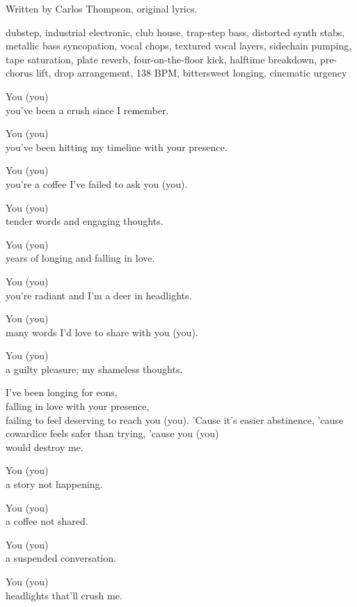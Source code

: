 
\label{sec:a-coffee-not-shared}
\begin{notes}
Written by Carlos Thompson, original lyrics.
\end{notes}
\begin{style}
dubstep, industrial electronic, club house, trap-step bass, distorted synth stabs, metallic bass syncopation, vocal chops, textured vocal layers, sidechain pumping, tape saturation, plate reverb, four-on-the-floor kick, halftime breakdown, pre-chorus lift, drop arrangement, 138 BPM, bittersweet longing, cinematic urgency
\end{style}
\begin{lyrics}
You (you)\\
you've been a crush since I remember.

You (you)\\
you've been hitting my timeline with your presence.

You (you)\\
you're a coffee I've failed to ask you (you).

You (you)\\
tender words and engaging thoughts.


You (you)\\
years of longing and falling in love.

You (you)\\
you're radiant and I'm a deer in headlights.

You (you)\\
many words I'd love to share with you (you).

You (you)\\
a guilty pleasure; my shameless thoughts.

I've been longing for eons,\\
falling in love with your presence,\\
failing to feel deserving to reach you (you).
'Cause it's easier abstinence,
'cause cowardice feels safer than trying,
'cause you (you)\\
would destroy me.

You (you)\\
a story not happening.

You (you)\\
a coffee not shared.

You (you)\\
a suspended conversation.

You (you)\\
headlights that'll crush me.
\end{lyrics}

